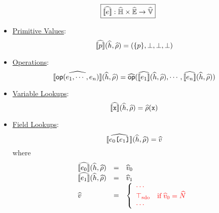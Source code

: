 \[
  \framebox{$\asem{\expr}: \aheapset \times \aenvset \rightarrow \avalset$}
\]
\begin{itemize}
  \item \underline{Primitive Values}:
    \[
      \widehat{\llbracket{p}\rrbracket}(\widehat{h}, \widehat{\rho}) = (\{p\}, \bot, \bot, \bot)
    \]
  \item \underline{Operations}:
    \[
      \widehat{\llbracket{\textsf{op}( e_1, \cdots, e_n )}\rrbracket}(\widehat{h}, \widehat{\rho}) =
        \widehat{\textsf{op}} ( \widehat{\llbracket{e_1}\rrbracket}(\widehat{h}, \widehat{\rho}), \cdots, \widehat{\llbracket{e_n}\rrbracket}(\widehat{h}, \widehat{\rho}) )
    \]
  \item \underline{Variable Lookups}:
    \[
      \asem{\varx}(\aheap, \aenv) = \aenv(\varx)
    \]
  \item \underline{Field Lookups}:
    \[
      \asem{\expr_0 \kwsl \expr_1 \kwsr}(\aheap, \aenv) = \aval
    \]
    where
    \[
      \begin{array}{lcl}
        \asem{\expr_0}(\aheap, \aenv) &=& \aval_0\\
        \asem{\expr_1}(\aheap, \aenv) &=& \aval_1\\
        \aval &=& \left\{
          \inred{
          \begin{array}{ll}
%
%
            \cdots\\
            \sdotop & \text{if} \;
            \aval_0 = \abs{\nt} \\
            \cdots\\
          \end{array}
          }
        \right.\\
      \end{array}
    \]
\end{itemize}

